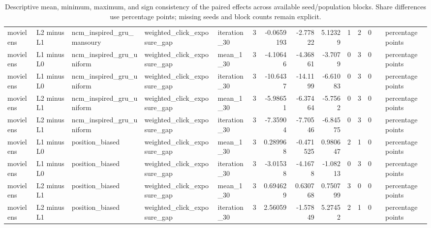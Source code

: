 \begin{table}[htbp!]
\begin{tabular}{lllllrrrrrrrll}
movielens & L2 minus L1 & ncm\_inspired\_gru\_mansoury & weighted\_click\_exposure\_gap & iteration\_30 & 3 & -0.0659193 & -2.77822 & 5.12329 & 1 & 2 & 0 &  & percentage points \\
movielens & L1 minus L0 & ncm\_inspired\_gru\_uniform & weighted\_click\_exposure\_gap & mean\_1\_30 & 3 & -4.10646 & -4.36861 & -3.7079 & 0 & 3 & 0 &  & percentage points \\
movielens & L1 minus L0 & ncm\_inspired\_gru\_uniform & weighted\_click\_exposure\_gap & iteration\_30 & 3 & -10.6437 & -14.1199 & -6.61083 & 0 & 3 & 0 &  & percentage points \\
movielens & L2 minus L1 & ncm\_inspired\_gru\_uniform & weighted\_click\_exposure\_gap & mean\_1\_30 & 3 & -5.98651 & -6.37464 & -5.7562 & 0 & 3 & 0 &  & percentage points \\
movielens & L2 minus L1 & ncm\_inspired\_gru\_uniform & weighted\_click\_exposure\_gap & iteration\_30 & 3 & -7.35904 & -7.70546 & -6.84575 & 0 & 3 & 0 &  & percentage points \\
movielens & L1 minus L0 & position\_biased & weighted\_click\_exposure\_gap & mean\_1\_30 & 3 & 0.289968 & -0.471525 & 0.980647 & 2 & 1 & 0 &  & percentage points \\
movielens & L1 minus L0 & position\_biased & weighted\_click\_exposure\_gap & iteration\_30 & 3 & -3.01538 & -4.1678 & -1.08213 & 0 & 3 & 0 &  & percentage points \\
movielens & L2 minus L1 & position\_biased & weighted\_click\_exposure\_gap & mean\_1\_30 & 3 & 0.694629 & 0.630768 & 0.750799 & 3 & 0 & 0 &  & percentage points \\
movielens & L2 minus L1 & position\_biased & weighted\_click\_exposure\_gap & iteration\_30 & 3 & 2.56059 & -1.57849 & 5.27452 & 2 & 1 & 0 &  & percentage points \\
\hline
\end{tabular}
\caption{Descriptive mean, minimum, maximum, and sign consistency of the paired effects across available seed/population blocks. Share differences use percentage points; missing seeds and block counts remain explicit.}
\label{chap:results:tab:rq2_seed_consistency_weighted_click_exposure_gap}
\end{table}
